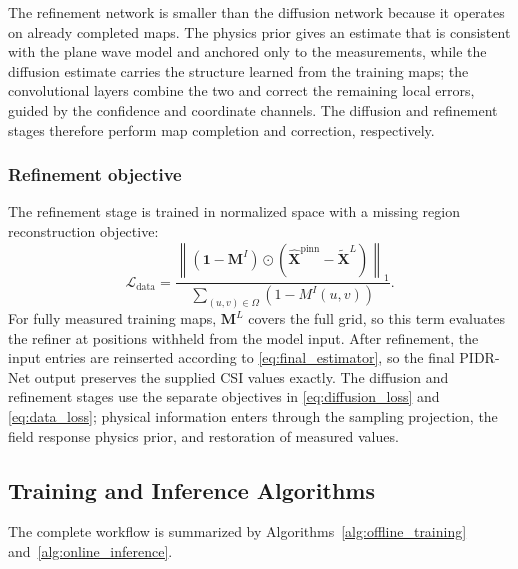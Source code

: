 \documentclass[lettersize,journal]{IEEEtran}
\newcommand{\mat}[1]{\mathbf{#1}}
\newcommand{\od}{\odot}
\newcommand{\norm}[1]{\left\lVert #1 \right\rVert}
\begin{document}
The refinement network is smaller than the diffusion network because it operates on already completed maps. The physics prior gives an estimate that is consistent with the plane wave model and anchored only to the measurements, while the diffusion estimate carries the structure learned from the training maps; the convolutional layers combine the two and correct the remaining local errors, guided by the confidence and coordinate channels. The diffusion and refinement stages therefore perform map completion and correction, respectively.

\subsubsection{Refinement objective}

The refinement stage is trained in normalized space with a missing region reconstruction objective:
\begin{equation}
    \mathcal{L}_{\mathrm{data}}=
    \frac{\norm{(\mat{1}-\mat{M}^{I})\od(\widehat{\mat{X}}^{\mathrm{pinn}}-\widetilde{\mat{X}}^{L})}_{1}}
    {\sum_{(u,v)\in\Omega}(1-M^{I}(u,v))}.
    \label{eq:data_loss}
\end{equation}
For fully measured training maps, $\mat{M}^{L}$ covers the full grid, so this term evaluates the refiner at positions withheld from the model input. After refinement, the input entries are reinserted according to \eqref{eq:final_estimator}, so the final PIDR-Net output preserves the supplied CSI values exactly. The diffusion and refinement stages use the separate objectives in \eqref{eq:diffusion_loss} and \eqref{eq:data_loss}; physical information enters through the sampling projection, the field response physics prior, and restoration of measured values.

\subsection{Training and Inference Algorithms}

The complete workflow is summarized by Algorithms~\ref{alg:offline_training} and~\ref{alg:online_inference}.
\end{document}

